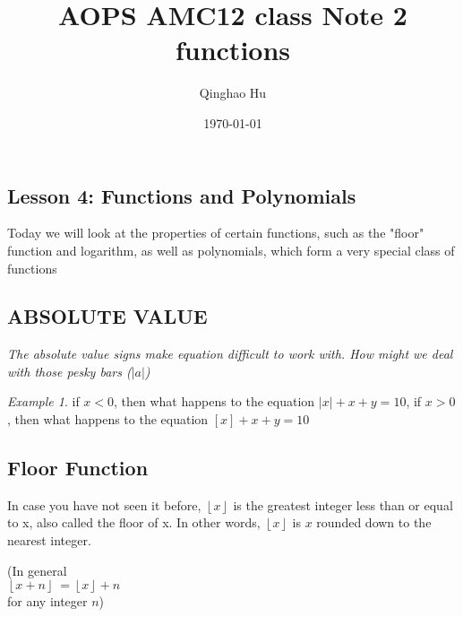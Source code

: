 \documentclass[10pt]{article}
\title{\textbf{AOPS AMC12 class Note 2} \\ \large functions}
\author{Qinghao Hu}
\date{\today}
\theoremstyle{remark}
\newtheorem*{example}{Example}
\begin{document}
\maketitle
\tableofcontents
\newpage

\begin{center}
\section{Lesson 4: Functions and Polynomials}
\end{center}
Today we will look at the properties of certain functions, such as the "floor" function and logarithm, as well as polynomials,
which form a very special class of functions
\newline

\subsection{ABSOLUTE VALUE}
\textit{The absolute value signs make equation difficult to work with. How might we deal with those pesky bars ($|a|$)} \newline

\begin{example}
if $x < 0$, then what happens to the equation $|x| + x + y = 10$, if $x > 0$, then what happens to the equation $[x] + x + y = 10$
\end{example}

\begin{center}
\end{center}

\subsection{Floor Function}
In case you have not seen it before, $\left \lfloor x \right \rfloor$ is the greatest integer less than or equal to x, also called the floor of x. In other words, 
$\left \lfloor x \right \rfloor$ is $x$ rounded down to the nearest integer.
\begin{center}
(In general \\
	$\left \lfloor x + n \right \rfloor\ = \left \lfloor x \right \rfloor + n$ \\	
for any integer $n$)
\end{center}
\end{document}
